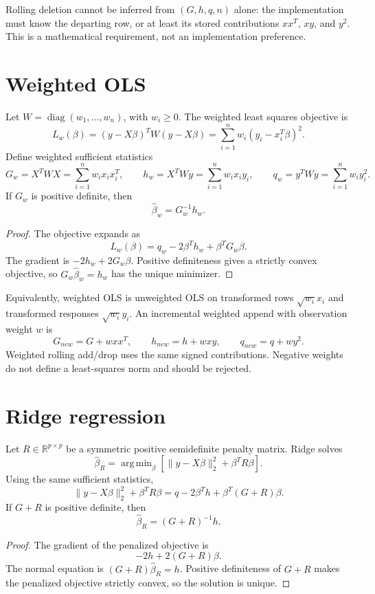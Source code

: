 \documentclass[11pt]{article}
\DeclareMathOperator*{\argmin}{arg\,min}
\begin{document}
Rolling deletion cannot be inferred from \((G,h,q,n)\) alone: the
implementation must know the departing row, or at least its stored
contributions \(xx^T\), \(xy\), and \(y^2\).  This is a mathematical
requirement, not an implementation preference.

\section{Weighted OLS}

Let \(W=\operatorname{diag}(w_1,\ldots,w_n)\), with \(w_i \ge 0\).  The
weighted least squares objective is
\[
  L_w(\beta) = (y-X\beta)^T W (y-X\beta)
  = \sum_{i=1}^n w_i(y_i-x_i^T\beta)^2 .
\]
Define weighted sufficient statistics
\[
  G_w = X^T W X = \sum_{i=1}^n w_i x_i x_i^T,\qquad
  h_w = X^T W y = \sum_{i=1}^n w_i x_i y_i,\qquad
  q_w = y^T W y = \sum_{i=1}^n w_i y_i^2 .
\]
If \(G_w\) is positive definite, then
\[
  \widehat{\beta}_w = G_w^{-1}h_w .
\]

\begin{proof}
The objective expands as
\[
  L_w(\beta) = q_w - 2\beta^T h_w + \beta^T G_w\beta .
\]
The gradient is \(-2h_w + 2G_w\beta\).  Positive definiteness gives a
strictly convex objective, so \(G_w\widehat{\beta}_w=h_w\) has the
unique minimizer.
\end{proof}

Equivalently, weighted OLS is unweighted OLS on transformed rows
\(\sqrt{w_i}x_i\) and transformed responses \(\sqrt{w_i}y_i\).  An
incremental weighted append with observation weight \(w\) is
\[
  G_{new}=G+wxx^T,\qquad
  h_{new}=h+wxy,\qquad
  q_{new}=q+wy^2 .
\]
Weighted rolling add/drop uses the same signed contributions.  Negative
weights do not define a least-squares norm and should be rejected.

\section{Ridge regression}

Let \(R\in\mathbb{R}^{p\times p}\) be a symmetric positive semidefinite
penalty matrix.  Ridge solves
\[
  \widehat{\beta}_R
  =
  \argmin_\beta
  \left[
    \|y-X\beta\|_2^2 + \beta^T R\beta
  \right] .
\]
Using the same sufficient statistics,
\[
  \|y-X\beta\|_2^2 + \beta^T R\beta
  =
  q - 2\beta^T h + \beta^T(G+R)\beta .
\]
If \(G+R\) is positive definite, then
\[
  \widehat{\beta}_R = (G+R)^{-1}h .
\]

\begin{proof}
The gradient of the penalized objective is
\[
  -2h + 2(G+R)\beta .
\]
The normal equation is \((G+R)\widehat{\beta}_R=h\).  Positive
definiteness of \(G+R\) makes the penalized objective strictly convex,
so the solution is unique.
\end{proof}
\end{document}
